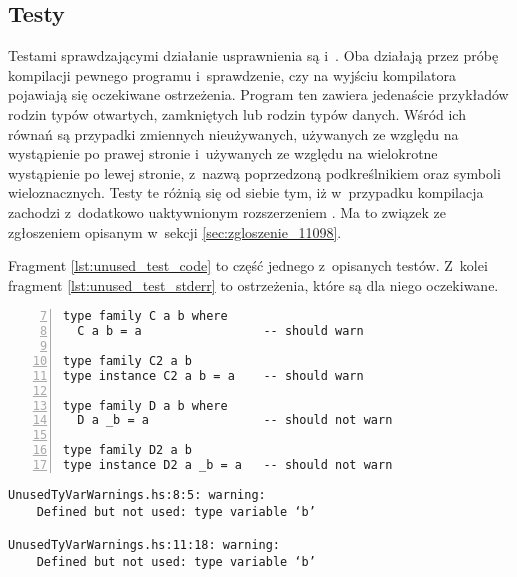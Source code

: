 \subsection{Testy} %

Testami sprawdzającymi działanie usprawnienia są 
i~. Oba działają przez próbę kompilacji pewnego
programu i~sprawdzenie, czy na wyjściu kompilatora pojawiają się oczekiwane
ostrzeżenia. Program ten zawiera jedenaście przykładów rodzin typów otwartych,
zamkniętych lub rodzin typów danych. Wśród ich równań są przypadki zmiennych
nieużywanych, używanych ze względu na wystąpienie po prawej stronie i~używanych
ze względu na wielokrotne wystąpienie po lewej stronie, z~nazwą poprzedzoną
podkreślnikiem oraz symboli wieloznacznych. Testy te różnią się od siebie tym,
iż w~przypadku  kompilacja zachodzi
z~dodatkowo uaktywnionym rozszerzeniem . Ma to związek ze zgłoszeniem
opisanym w~sekcji \ref{sec:zgloszenie_11098}.

Fragment \ref{lst:unused_test_code} to część jednego z~opisanych testów.
Z~kolei fragment \ref{lst:unused_test_stderr} to ostrzeżenia, które są dla niego oczekiwane.

\begin{lstlisting}[float,numbers=left,firstnumber=7,label={lst:unused_test_code},
                   caption={Fragment testu \code{UnusedTyVarWarnings} z równaniami wywołującymi ostrzeżenia lub zawierającymi zmienne poprzedzone podkreślnikiem.}]
type family C a b where
  C a b = a                 -- should warn

type family C2 a b
type instance C2 a b = a    -- should warn

type family D a b where
  D a _b = a                -- should not warn

type family D2 a b
type instance D2 a _b = a   -- should not warn
\end{lstlisting}

\begin{lstlisting}[float,language={},label={lst:unused_test_stderr},
                   caption={Ostrzeżenia generowany przez kompilator dla fragmentu \ref{lst:unused_test_code} po wprowadzeniu zmian.}]
UnusedTyVarWarnings.hs:8:5: warning:
    Defined but not used: type variable ‘b’

UnusedTyVarWarnings.hs:11:18: warning:
    Defined but not used: type variable ‘b’
\end{lstlisting}

